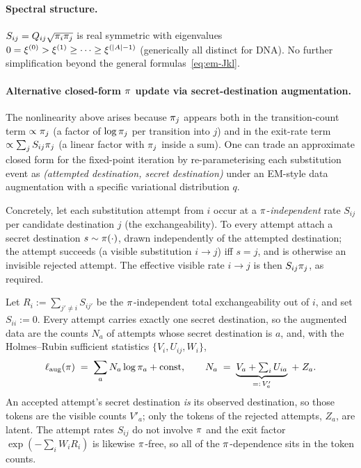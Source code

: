 \paragraph{Spectral structure.}
$S_{ij} = Q_{ij}\sqrt{\pi_i \pi_j}$ is real symmetric
with eigenvalues $0 = \xi^{(0)} > \xi^{(1)} \geq \cdots \geq \xi^{(|A|-1)}$
(generically all distinct for DNA).
No further simplification beyond the general formulas~\eqref{eq:em-Jkl}.

\paragraph{Alternative closed-form $\pi$ update via secret-destination
augmentation.}
The nonlinearity above arises because $\pi_j$ appears both in the
transition-count term $\propto \pi_j$ (a factor of $\log\pi_j$ per
transition into $j$) and in the exit-rate term $\propto \sum_j S_{ij}\pi_j$
(a linear factor with $\pi_j$ inside a sum). One can trade an approximate
closed form for the fixed-point iteration by re-parameterising each
substitution event as \emph{(attempted destination, secret destination)}
under an EM-style data augmentation with a specific variational
distribution $q$.

Concretely, let each substitution attempt from $i$ occur at a
$\pi$-\emph{independent} rate $S_{ij}$ per candidate destination $j$
(the exchangeability). To every attempt attach a secret destination
$s \sim \pi(\cdot)$, drawn independently of the attempted destination;
the attempt succeeds (a visible substitution $i \to j$) iff $s = j$, and
is otherwise an invisible rejected attempt. The effective visible rate
$i \to j$ is then $S_{ij}\pi_j$, as required.

Let $R_i := \sum_{j' \ne i} S_{ij'}$ be the $\pi$-independent total
exchangeability out of $i$, and set $S_{ii} := 0$. Every attempt carries
exactly one secret destination, so the augmented data are the counts
$N_a$ of attempts whose secret destination is $a$, and, with the
Holmes--Rubin sufficient statistics $\{V_i, U_{ij}, W_i\}$,
\begin{equation}
\label{eq:gtr-secret-dest-cdl}
\ell_{\mathrm{aug}}(\pi) \;=\; \sum_a N_a \log \pi_a + \mathrm{const},
\qquad
N_a \;=\; \underbrace{V_a + \textstyle\sum_i U_{ia}}_{=:\,V'_a} \;+\; Z_a .
\end{equation}
An accepted attempt's secret destination \emph{is} its observed
destination, so those tokens are the visible counts $V'_a$; only the
tokens of the rejected attempts, $Z_a$, are latent. The attempt rates
$S_{ij}$ do not involve $\pi$ and the exit factor
$\exp(-\sum_i W_i R_i)$ is likewise $\pi$-free, so all of the
$\pi$-dependence sits in the token counts.

